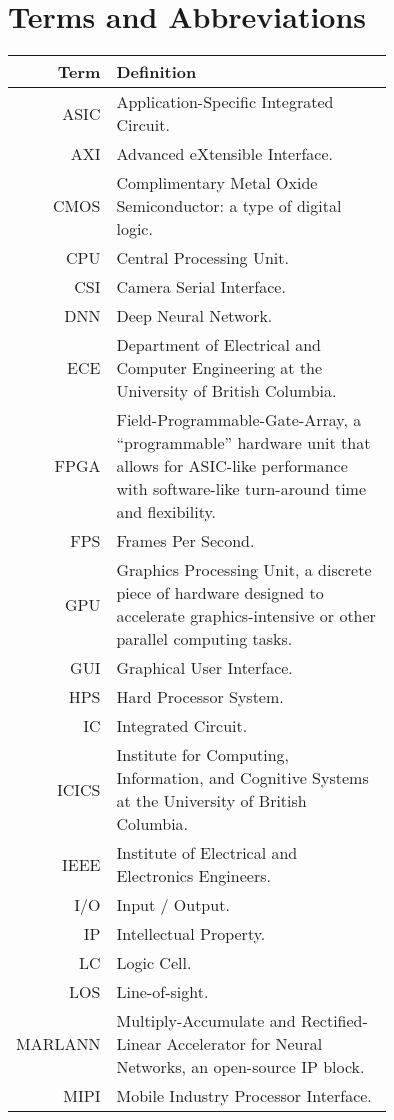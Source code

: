 \section*{Terms and Abbreviations}

\begin{tabular}[h]{rp{0.75\linewidth}}
    \hline
    \textbf{Term} & \textbf{Definition}\\
    \hline

    ASIC & Application-Specific Integrated Circuit.\\
    AXI & Advanced eXtensible Interface. \\
    CMOS & Complimentary Metal Oxide Semiconductor: a type of digital logic. \\
    CPU & Central Processing Unit. \\
    CSI & Camera Serial Interface. \\
    DNN & Deep Neural Network. \\
    ECE & Department of Electrical and Computer Engineering at the University of British Columbia.\\
    FPGA & Field-Programmable-Gate-Array, a ``programmable'' hardware unit that allows for ASIC-like performance with software-like turn-around time and flexibility.\\
    FPS & Frames Per Second.\\
    GPU & Graphics Processing Unit, a discrete piece of hardware designed to accelerate graphics-intensive or other parallel computing tasks.\\
    GUI & Graphical User Interface. \\
    HPS & Hard Processor System. \\
    IC & Integrated Circuit. \\
    ICICS & Institute for Computing, Information, and Cognitive Systems at the University of British Columbia.\\
    IEEE & Institute of Electrical and Electronics Engineers. \\
    I/O & Input / Output. \\
    IP & Intellectual Property. \\
    LC & Logic Cell. \\
    LOS & Line-of-sight.\\
    MARLANN & Multiply-Accumulate and Rectified-Linear Accelerator for Neural Networks, an open-source IP block. \\
    MIPI & Mobile Industry Processor Interface. \\

\end{tabular}
